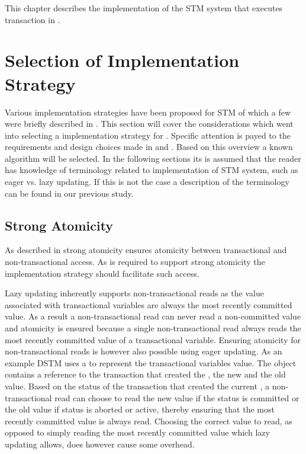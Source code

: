 \makeatletter {}\makeatother
{}
This chapter describes the implementation of the \ac{STM} system that executes transaction in \stmname.
\label{chap:implementation}
\section{Selection of Implementation Strategy}
Various implementation strategies have been proposed for \ac{STM} of which a few were briefly described in . This section will cover the considerations which went into selecting a implementation strategy for \stmname. Specific attention is payed to the requirements and design choices made in  and . Based on this overview a known algorithm will be selected. In the following sections its is assumed that the reader has knowledge of terminology related to implementation of \ac{STM} system, such as eager vs. lazy updating. If this is not the case a description of the terminology can be found in our previous study\cite[p. 53]{dpt907e14trending}.

\subsection{Strong Atomicity}
As described in  strong atomicity ensures atomicity between transactional and non-transactional access. As \stmnamesp is required to support strong atomicity the implementation strategy should facilitate such access.

Lazy updating inherently supports non-transactional reads as the value associated with transactional variables are always the most recently committed value\cite[p. 2084]{herlihy2011tm}\cite[p. 21]{harris2010transactional}. As a result a non-transactional read can never read a non-committed value and atomicity is ensured because a single non-transactional read always reads the most recently committed value of a transactional variable. Ensuring atomicity for non-transactional reads is however also possible using eager updating. As an example DSTM\cite{herlihy2003software} uses a  to represent the transactional variables value. The  object contains a reference to the transaction that created the , the new and the old value. Based on the status of the transaction that created the current , a non-transactional read can choose to read the new value if the status is committed or the old value if status is aborted or active, thereby ensuring that the most recently committed value is always read. Choosing the correct value to read, as opposed to simply reading the most recently committed value which lazy updating allows, does however cause some overhead.


